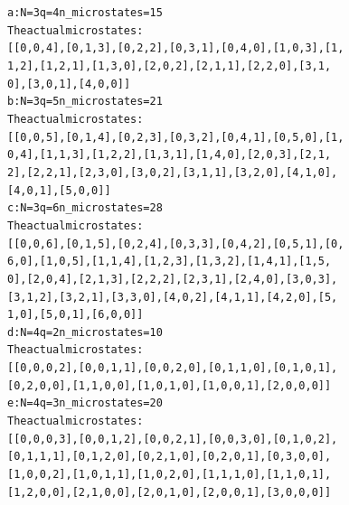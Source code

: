 \documentclass[letterpaper,10pt,english]{/usr/local/lib/python2.7/dist-packages/sphinx/texinputs/sphinxhowto}
\newenvironment{ColorVerbatim}
        {\begin{mdframed}[%
            roundcorner=1.0pt, %
            backgroundcolor=nbframe-bg, %
            userdefinedwidth=1\linewidth, %
            leftmargin=0.1\linewidth, %
            innerleftmargin=0pt, %
            innerrightmargin=0pt, %
            linecolor=nbframe-border, %
            linewidth=1pt, %
            usetwoside=false, %
            everyline=true, %
            innerlinewidth=3pt, %
            innerlinecolor=nbframe-bg, %
            middlelinewidth=1pt, %
            middlelinecolor=nbframe-bg, %
            outerlinewidth=0.5pt, %
            outerlinecolor=nbframe-border, %
            needspace=0pt
        ]}
        {\end{mdframed}}
\newenvironment{InvisibleVerbatim}
        {\begin{mdframed}[leftmargin=0.1\linewidth,innerleftmargin=3pt,innerrightmargin=3pt, userdefinedwidth=1\linewidth, linewidth=0pt, linecolor=white, usetwoside=false]}
        {\end{mdframed}}
\begin{document}
\begin{ColorVerbatim}
            
                \vspace{-0.2\baselineskip}
            
        \end{ColorVerbatim}
    

    

        
        

            
                \begin{InvisibleVerbatim}
                \vspace{-0.5\baselineskip}
\begin{alltt}a: N=3 q=4 n\_microstates=15
The actual microstates:
[[0, 0, 4], [0, 1, 3], [0, 2, 2], [0, 3, 1], [0, 4, 0], [1, 0, 3], [1,
1, 2], [1, 2, 1], [1, 3, 0], [2, 0, 2], [2, 1, 1], [2, 2, 0], [3, 1,
0], [3, 0, 1], [4, 0, 0]]
b: N=3 q=5 n\_microstates=21
The actual microstates:
[[0, 0, 5], [0, 1, 4], [0, 2, 3], [0, 3, 2], [0, 4, 1], [0, 5, 0], [1,
0, 4], [1, 1, 3], [1, 2, 2], [1, 3, 1], [1, 4, 0], [2, 0, 3], [2, 1,
2], [2, 2, 1], [2, 3, 0], [3, 0, 2], [3, 1, 1], [3, 2, 0], [4, 1, 0],
[4, 0, 1], [5, 0, 0]]
c: N=3 q=6 n\_microstates=28
The actual microstates:
[[0, 0, 6], [0, 1, 5], [0, 2, 4], [0, 3, 3], [0, 4, 2], [0, 5, 1], [0,
6, 0], [1, 0, 5], [1, 1, 4], [1, 2, 3], [1, 3, 2], [1, 4, 1], [1, 5,
0], [2, 0, 4], [2, 1, 3], [2, 2, 2], [2, 3, 1], [2, 4, 0], [3, 0, 3],
[3, 1, 2], [3, 2, 1], [3, 3, 0], [4, 0, 2], [4, 1, 1], [4, 2, 0], [5,
1, 0], [5, 0, 1], [6, 0, 0]]
d: N=4 q=2 n\_microstates=10
The actual microstates:
[[0, 0, 0, 2], [0, 0, 1, 1], [0, 0, 2, 0], [0, 1, 1, 0], [0, 1, 0, 1],
[0, 2, 0, 0], [1, 1, 0, 0], [1, 0, 1, 0], [1, 0, 0, 1], [2, 0, 0, 0]]
e: N=4 q=3 n\_microstates=20
The actual microstates:
[[0, 0, 0, 3], [0, 0, 1, 2], [0, 0, 2, 1], [0, 0, 3, 0], [0, 1, 0, 2],
[0, 1, 1, 1], [0, 1, 2, 0], [0, 2, 1, 0], [0, 2, 0, 1], [0, 3, 0, 0],
[1, 0, 0, 2], [1, 0, 1, 1], [1, 0, 2, 0], [1, 1, 1, 0], [1, 1, 0, 1],
[1, 2, 0, 0], [2, 1, 0, 0], [2, 0, 1, 0], [2, 0, 0, 1], [3, 0, 0, 0]]
\end{alltt}

            \end{InvisibleVerbatim}
            
        
    
\end{document}
